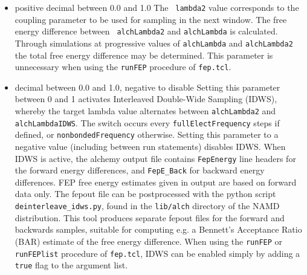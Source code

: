 \begin{itemize}
\item
{} {positive decimal between 0.0 and 1.0} {The {\tt
lambda2} value corresponds to the coupling parameter to be used for
sampling in the next window.  The free energy difference between {\tt
alchLambda2} and {\tt alchLambda} is calculated.  Through simulations
at progressive values of {\tt alchLambda} and {\tt alchLambda2} the
total free energy difference may be determined.
This parameter is unnecessary when using the \texttt{runFEP} procedure of
\texttt{fep.tcl}.}


\item
{}
{decimal between 0.0 and 1.0, negative to disable}
{Setting this parameter between 0 and 1 activates Interleaved Double-Wide Sampling (IDWS), whereby the target lambda value alternates between {\tt alchLambda2} and {\tt alchLambdaIDWS}.
The switch occurs every {\tt fullElectFrequency} steps if defined, or {\tt nonbondedFrequency} otherwise.
Setting this parameter to a negative value (including between run statements) disables IDWS.
When IDWS is active, the alchemy output file contains {\tt FepEnergy} line headers for the forward energy differences, and {\tt FepE\_Back} for backward energy differences.
FEP free energy estimates given in output are based on forward data only.
The fepout file can be postprocessed with the python script \texttt{deinterleave\_idws.py}, found in
the \texttt{lib/alch} directory of the NAMD distribution.
This tool produces separate fepout files for the forward and backwards samples, suitable for computing e.g.
a Bennett's Acceptance Ratio (BAR) estimate of the free energy difference.
When using the \texttt{runFEP} or \texttt{runFEPlist} procedure of \texttt{fep.tcl}, IDWS can be enabled
simply by adding a \texttt{true} flag to the argument list.
}


\end{itemize}
